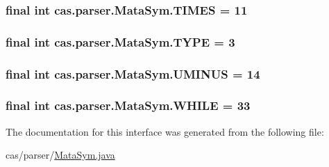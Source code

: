 \hypertarget{interfacecas_1_1parser_1_1_mata_sym_a9c8b5d0a28df85b64c4da297faa654a2}{
\subsubsection[{T\-I\-M\-E\-S}]{\setlength{\rightskip}{0pt plus 5cm}final int cas.\-parser.\-Mata\-Sym.\-T\-I\-M\-E\-S = 11\hspace{0.3cm}{\ttfamily [static]}}}\label{interfacecas_1_1parser_1_1_mata_sym_a9c8b5d0a28df85b64c4da297faa654a2}
\hypertarget{interfacecas_1_1parser_1_1_mata_sym_a06577560a87146085a83831e11d726e2}{
\subsubsection[{T\-Y\-P\-E}]{\setlength{\rightskip}{0pt plus 5cm}final int cas.\-parser.\-Mata\-Sym.\-T\-Y\-P\-E = 3\hspace{0.3cm}{\ttfamily [static]}}}\label{interfacecas_1_1parser_1_1_mata_sym_a06577560a87146085a83831e11d726e2}
\hypertarget{interfacecas_1_1parser_1_1_mata_sym_a6e7f410e8093429ba49251e35afe5d0d}{
\subsubsection[{U\-M\-I\-N\-U\-S}]{\setlength{\rightskip}{0pt plus 5cm}final int cas.\-parser.\-Mata\-Sym.\-U\-M\-I\-N\-U\-S = 14\hspace{0.3cm}{\ttfamily [static]}}}\label{interfacecas_1_1parser_1_1_mata_sym_a6e7f410e8093429ba49251e35afe5d0d}
\hypertarget{interfacecas_1_1parser_1_1_mata_sym_ac3726039e2316f3dc8cb4c9ec5fe870d}{
\subsubsection[{W\-H\-I\-L\-E}]{\setlength{\rightskip}{0pt plus 5cm}final int cas.\-parser.\-Mata\-Sym.\-W\-H\-I\-L\-E = 33\hspace{0.3cm}{\ttfamily [static]}}}\label{interfacecas_1_1parser_1_1_mata_sym_ac3726039e2316f3dc8cb4c9ec5fe870d}


The documentation for this interface was generated from the following file\-:\begin{DoxyCompactItemize}
\item 
cas/parser/\hyperlink{_mata_sym_8java}{Mata\-Sym.\-java}\end{DoxyCompactItemize}
